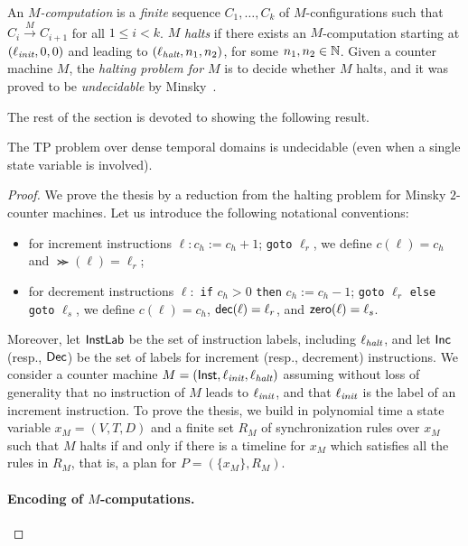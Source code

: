 An \emph{$M$-computation} is a \emph{finite} sequence $C_1,\ldots ,C_k$ of $M$-configurations such that $C_i \stackrel{M}{\longrightarrow} C_{i+1}$ for all $1\leq i<k$.
%
$M$ \emph{halts} if there exists an $M$-computation starting at $(\ell_{\textit{init}}, 0, 0)$ and leading to 
$(\ell_{{\textit{halt}}}, n_1, n_2)$, for some $n_1,n_2\in\mathbb{N}$. 
Given a counter machine $M$,
the \emph{halting problem for $M$} is to decide whether $M$ halts, and it was proved to be \emph{undecidable} by Minsky~\cite{Minsky67}.

The rest of the section is devoted to showing the following result.
\begin{theorem}\label{theorem:undecidability}
The TP problem over dense temporal domains is undecidable (even when a single state variable is involved).
\end{theorem}
\begin{proof}
We prove the thesis by a reduction from the halting problem for Minsky $2$-counter machines. 
%
Let us introduce the following notational conventions:
\begin{itemize}
  \item for increment instructions $\ell : c_h:= c_h+1$; \texttt{goto} $\ell_r$, we define $c(\ell)= c_h$ and $\Succ(\ell)= \ell_r$;
  \item  for decrement instructions $\ell:$ \texttt{if} $c_h>0$ \texttt{then} $c_h:= c_h-1$; \texttt{goto}  $\ell_r$ \texttt{else goto} $\ell_s$,
  we define $c(\ell)= c_h$, ${\mathsf{dec}}(\ell)= \ell_r$, and ${\mathsf{zero}}(\ell)= \ell_s$.
\end{itemize}
Moreover, let $\mathsf{InstLab}$ be the set of instruction labels, including $\ell_{\textit{halt}}$, and let
$\mathsf{Inc}$ (resp., $\mathsf{Dec}$) be the set of labels for increment (resp., decrement) instructions.
%
We consider a counter machine $M = (\mathsf{Inst},\ell_{\textit{init}},\ell_{\textit{halt}})$ assuming without loss of generality that
no instruction of $M$ leads to $\ell_{\textit{init}}$, and that $\ell_{\textit{init}}$ is the label of an increment instruction.
To prove the thesis, we build in polynomial time a state variable $x_M=(V,T,D)$ and a finite set $R_M$ of synchronization rules
over $x_M$ such that $M$ halts if and only if there is a timeline for $x_M$ which satisfies all the rules in $R_M$, that is, a plan for $P=(\{x_M\},R_M)$.

\paragraph*{Encoding of $M$-computations.}


\end{proof}
